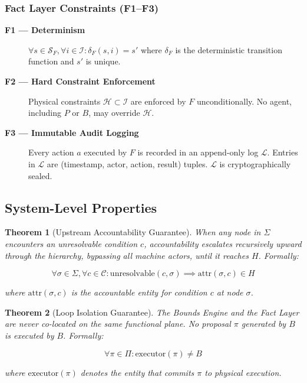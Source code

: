 \documentclass[12pt]{article}
\newtheorem{theorem}{Theorem}
\begin{document}
\subsubsection{Fact Layer Constraints (F1--F3)}
\begin{description}
\item[\textbf{F1 — Determinism}] $\forall s \in \mathcal{S}_F, \forall i \in \mathcal{I}: \delta_F(s, i) = s'$ where $\delta_F$ is the deterministic transition function and $s'$ is unique.
\item[\textbf{F2 — Hard Constraint Enforcement}] Physical constraints $\mathcal{H} \subset \mathcal{I}$ are enforced by $F$ unconditionally. No agent, including $P$ or $B$, may override $\mathcal{H}$.
\item[\textbf{F3 — Immutable Audit Logging}] Every action $a$ executed by $F$ is recorded in an append-only log $\mathcal{L}$. Entries in $\mathcal{L}$ are (timestamp, actor, action, result) tuples. $\mathcal{L}$ is cryptographically sealed.
\end{description}

\subsection{System-Level Properties}

\begin{theorem}[Upstream Accountability Guarantee]
When any node in $\Sigma$ encounters an unresolvable condition $c$, accountability escalates recursively upward through the hierarchy, bypassing all machine actors, until it reaches $H$. Formally:

\begin{equation}
\forall \sigma \in \Sigma, \forall c \in \mathcal{C}: \text{unresolvable}(c, \sigma) \implies \text{attr}(\sigma, c) \in H
\end{equation}

where $\text{attr}(\sigma, c)$ is the accountable entity for condition $c$ at node $\sigma$.
\end{theorem}

\begin{theorem}[Loop Isolation Guarantee]
The Bounds Engine and the Fact Layer are never co-located on the same functional plane. No proposal $\pi$ generated by $B$ is executed by $B$. Formally:

\begin{equation}
\forall \pi \in \Pi: \text{executor}(\pi) \neq B
\end{equation}

where $\text{executor}(\pi)$ denotes the entity that commits $\pi$ to physical execution.
\end{theorem}
\end{document}
